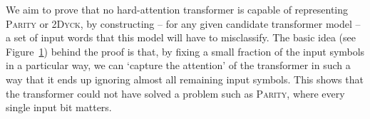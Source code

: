 \documentclass[11pt,a4paper]{article}
\begin{document}
\begin{figure}[ht]
	\label{fig:depth-reduction}
\end{figure}

We aim to prove that no hard-attention transformer is capable of representing \textsc{Parity} or \textsc{2Dyck}, by constructing -- for any given candidate transformer model -- a set of input words that this model will have to misclassify.
The basic idea (see Figure~\ref{fig:depth-reduction}) behind the proof is that, by fixing a small fraction of the input symbols in a particular way, we can `capture the attention' of the transformer in such a way that it ends up ignoring almost all remaining input symbols.
This shows that the transformer could not have solved a problem such as \textsc{Parity}, where every single input bit matters. %




\end{document}

